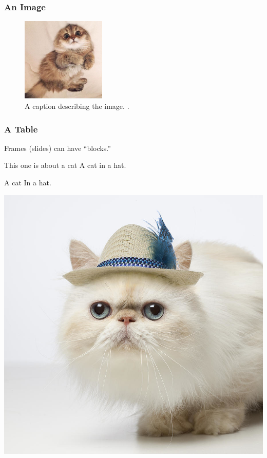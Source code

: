 \begin{frame}
  \frametitle{An Image}
  \begin{figure}[htbp!]
    \begin{center}
      \includegraphics[height=4cm]{./images/kitten}
    \end{center}
          \caption{A caption describing the image. \cite{lastname_firstword_1900}.}
    \label{fig:kittenfigure}
  \end{figure}
\end{frame}

\begin{frame}
  \frametitle{A Table}
        Frames (slides) can have ``blocks.'' 
        \begin{block}{This one is about a cat}
                A cat in a hat.
        \end{block}
        \begin{block}{A cat}
                In a hat.

                \includegraphics[height=0.2\textheight]{./images/catinhat}
        \end{block}
        
\end{frame}
